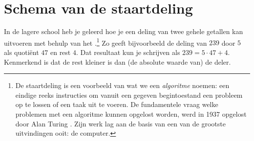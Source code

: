 \documentclass{ximera}
\begin{document}
	\author{Koen De Naeghel}
	\label{xim:veeltermen_schema_van_de_staartdeling}

\newcommand{\tikzit}[2][\width]{%
    \begin{image}[#1]
        \tikzitinline{#2}
    \end{image}%
}


\providecommand{\tikzexportScale}[1][1.5]{
    \iftikzexport
    \tikzset{every picture/.append style={scale=#1, transform shape}}
    \fi
    }


\providecommand{\tikzitOptions}{}
\iftikzexport
\renewcommand{\tikzitOptions}{[scale=1.5, transform shape]}
\fi

\newcommand{\tikzitinline}[2][0.1]{
    \begin{tikzpicture}
        \node (a) {#2};
        \path (current bounding box.south west) ++(-0.0,-0.0) coordinate (newSW);
        \path (current bounding box.north east) ++(#1,#1) coordinate (newNE);
        \useasboundingbox (newSW) rectangle (newNE);
    \end{tikzpicture}

}  


\section{Schema van de staartdeling}

In de lagere school heb je geleerd hoe je een deling van twee gehele getallen kan uitvoeren met behulp van het .\footnote{De staartdeling is een voorbeeld van wat we een {\em algoritme} noemen: een eindige reeks instructies om vanuit een gegeven begintoestand een probleem op te lossen of een taak uit te voeren. De fundamentele vraag welke problemen met een algoritme kunnen opgelost worden, werd in 1937 opgelost door Alan Turing \cite{Turing}. Zijn werk lag aan de basis van een van de grootste uitvindingen ooit: de computer.} Zo geeft bijvoorbeeld de deling van $239$ door $5$ als quoti\"ent $47$ en rest $4$. Dat resultaat kun je schrijven als $239 = 5 \cdot 47 + 4$. Kenmerkend is dat de rest kleiner is dan (de absolute waarde van) de deler. 
\end{document}
